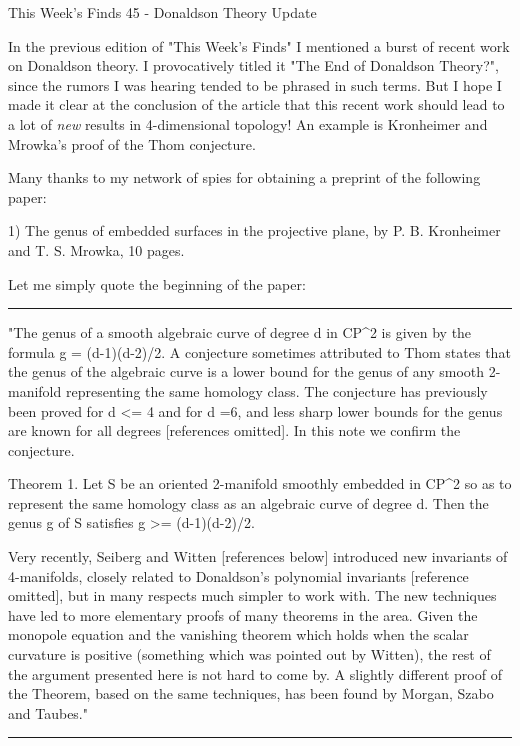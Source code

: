 

This Week's Finds 45 - Donaldson Theory Update

In the previous edition of "This Week's Finds" I mentioned a burst of
recent work on Donaldson theory. I provocatively titled it "The End of
Donaldson Theory?", since the rumors I was hearing tended to be phrased
in such terms.  But I hope I made it clear at the conclusion of the
article that this recent work should lead to a lot of \emph{new} results in
4-dimensional topology!  An example is Kronheimer and Mrowka's proof of
the Thom conjecture.  

Many thanks to my network of spies for obtaining a preprint of the
following paper:


1) The genus of embedded surfaces in the projective plane, by 
P. B. Kronheimer and T. S. Mrowka, 10 pages.


Let me simply quote the beginning of the paper:

\par\noindent\rule{\textwidth}{0.4pt}
"The genus of a smooth algebraic curve of degree d in CP^2 is given by
the formula g = (d-1)(d-2)/2.  A conjecture sometimes attributed to Thom
states that the genus of the algebraic curve is a lower bound for the
genus of any smooth 2-manifold representing the same homology class. The
conjecture has previously been proved for d <= 4 and for d =6, and less
sharp lower bounds for the genus are known for all degrees [references
omitted].  In this note we confirm the conjecture.
 
Theorem 1.  Let S be an oriented 2-manifold smoothly embedded in CP^2 so
as to represent the same homology class as an algebraic curve of degree
d.  Then the genus g of S satisfies g >= (d-1)(d-2)/2.

Very recently, Seiberg and Witten [references below] introduced new
invariants of 4-manifolds, closely related to Donaldson's polynomial
invariants [reference omitted], but in many respects much simpler to
work with.  The new techniques have led to more elementary proofs of
many theorems in the area.  Given the monopole equation and the
vanishing theorem which holds when the scalar curvature is positive
(something which was pointed out by Witten), the rest of the argument
presented here is not hard to come by.  A slightly different proof of
the Theorem, based on the same techniques, has been found by Morgan,
Szabo and Taubes."
\par\noindent\rule{\textwidth}{0.4pt}

